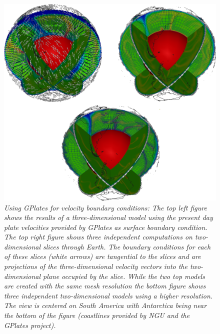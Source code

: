 \documentclass{article}
\begin{document}
\begin{figure}
  \includegraphics[width=\textwidth]{cookbooks/gplates/gplates-comparison.png}
  \hfill
  \caption{\it Using GPlates for velocity boundary conditions: The top left figure shows
  the results of a three-dimensional model using the present day plate velocities
  provided by GPlates as surface boundary condition. 
  The top right figure shows three independent computations 
  on two-dimensional slices through Earth. The boundary conditions for each of these slices (white
  arrows) are tangential to the slices and are projections of the
  three-dimensional velocity vectors into the two-dimensional plane
  occupied by the slice. While the two top models are created with the same mesh resolution
  the bottom figure shows three independent two-dimensional models using a higher resolution. 
  The view is centered on South America with Antarctica being near the bottom of
  the figure (coastlines provided by NGU and the GPlates project).}
  \label{fig:gv-1}
\end{figure}
\end{document}
